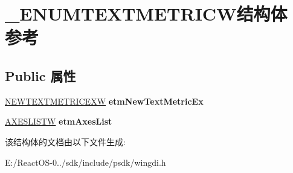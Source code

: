 \hypertarget{struct___e_n_u_m_t_e_x_t_m_e_t_r_i_c_w}{}\section{\+\_\+\+E\+N\+U\+M\+T\+E\+X\+T\+M\+E\+T\+R\+I\+C\+W结构体 参考}
\label{struct___e_n_u_m_t_e_x_t_m_e_t_r_i_c_w}
\subsection*{Public 属性}
\begin{DoxyCompactItemize}
\item 
\mbox{\label{struct___e_n_u_m_t_e_x_t_m_e_t_r_i_c_w_a15c30ac9001d7ff04561400025efe49d}} 
\hyperlink{structtag_n_e_w_t_e_x_t_m_e_t_r_i_c_e_x_w}{N\+E\+W\+T\+E\+X\+T\+M\+E\+T\+R\+I\+C\+E\+XW} {\bfseries etm\+New\+Text\+Metric\+Ex}
\item 
\mbox{\label{struct___e_n_u_m_t_e_x_t_m_e_t_r_i_c_w_a15fec611288f45198489fa16d2e1aa73}} 
\hyperlink{struct___a_x_e_s_l_i_s_t_w}{A\+X\+E\+S\+L\+I\+S\+TW} {\bfseries etm\+Axes\+List}
\end{DoxyCompactItemize}


该结构体的文档由以下文件生成\+:\begin{DoxyCompactItemize}
\item 
E\+:/\+React\+O\+S-\/0../sdk/include/psdk/wingdi.\+h\end{DoxyCompactItemize}
